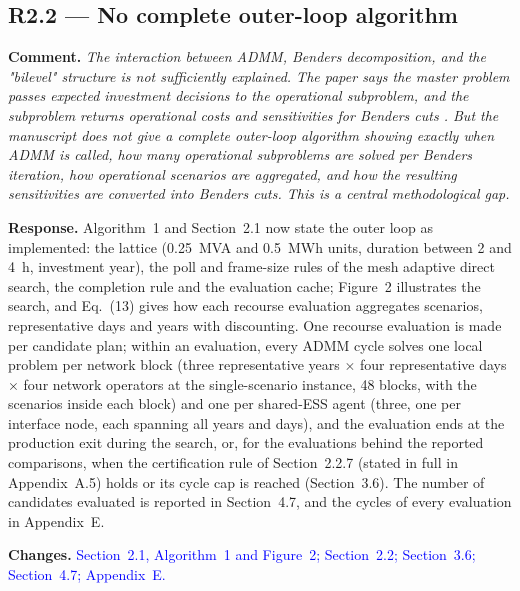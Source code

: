 \documentclass[11pt]{article}
\newcommand{\rcomment}[1]{\par\medskip\noindent\textbf{Comment.} \textit{#1}\par\smallskip}
\newcommand{\rresponse}[1]{\noindent\textbf{Response.} #1\par\smallskip}
\newcommand{\rchanges}[1]{\noindent\textbf{Changes.} \textcolor{blue}{#1}\par\medskip}
\begin{document}
\subsection*{R2.2 --- No complete outer-loop algorithm}
\rcomment{The interaction between ADMM, Benders decomposition, and the "bilevel" structure is not sufficiently explained. The paper says the master problem passes expected investment decisions to the operational subproblem, and the subproblem returns operational costs and sensitivities for Benders cuts . But the manuscript does not give a complete outer-loop algorithm showing exactly when ADMM is called, how many operational subproblems are solved per Benders iteration, how operational scenarios are aggregated, and how the resulting sensitivities are converted into Benders cuts. This is a central methodological gap.}
\rresponse{Algorithm~1 and Section~2.1 now state the outer loop as implemented: the lattice (0.25~MVA and 0.5~MWh units, duration between 2 and 4~h, investment year), the poll and frame-size rules of the mesh adaptive direct search, the completion rule and the evaluation cache; Figure~2 illustrates the search, and Eq.~(13) gives how each recourse evaluation aggregates scenarios, representative days and years with discounting. One recourse evaluation is made per candidate plan; within an evaluation, every ADMM cycle solves one local problem per network block (three representative years $\times$ four representative days $\times$ four network operators at the single-scenario instance, 48 blocks, with the scenarios inside each block) and one per shared-ESS agent (three, one per interface node, each spanning all years and days), and the evaluation ends at the production exit during the search, or, for the evaluations behind the reported comparisons, when the certification rule of Section~2.2.7 (stated in full in Appendix~A.5) holds or its cycle cap is reached (Section~3.6). The number of candidates evaluated is reported in Section~4.7, and the cycles of every evaluation in Appendix~E.}
\rchanges{Section~2.1, Algorithm~1 and Figure~2; Section~2.2; Section~3.6; Section~4.7; Appendix~E.}
\end{document}

